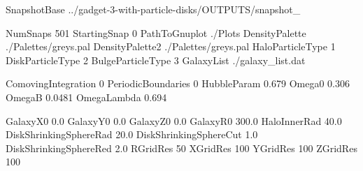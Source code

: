 %
%




SnapshotBase       ../gadget-3-with-particle-disks/OUTPUTS/snapshot_

NumSnaps           501
StartingSnap       0
PathToGnuplot      ./Plots
DensityPalette     ./Palettes/greys.pal
DensityPalette2    ./Palettes/greys.pal
HaloParticleType   1
DiskParticleType   2
BulgeParticleType  3
GalaxyList         ./galaxy_list.dat


ComovingIntegration    0
PeriodicBoundaries     0
HubbleParam            0.679
Omega0                 0.306
OmegaB                 0.0481
OmegaLambda            0.694


GalaxyX0                0.0
GalaxyY0                0.0
GalaxyZ0                0.0
GalaxyR0                300.0
HaloInnerRad            40.0
DiskShrinkingSphereRad  20.0
DiskShrinkingSphereCut  1.0
DiskShrinkingSphereRed  2.0
RGridRes                50
XGridRes                100
YGridRes                100
ZGridRes                100
